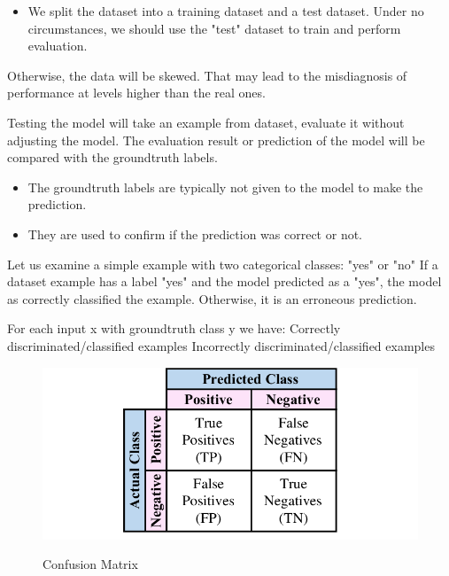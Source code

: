 \begin{itemize}
\item We split the dataset into a training dataset and a test dataset. Under no circumstances, we should use the "test" dataset to train and perform evaluation.
\end{itemize}
 Otherwise, the data will be skewed. That may lead to the misdiagnosis of performance at levels higher than the real ones.

Testing the model will take an example from dataset, evaluate it without adjusting the model.
The evaluation result or prediction of the model will be compared with the groundtruth labels.
\begin{itemize}
\item The groundtruth labels are typically not given to the model to make the prediction.
\item They are used to confirm if the prediction was correct or not.
\end{itemize}

Let us examine a simple example with two categorical classes:
"yes" or "no"
If a dataset example has a label "yes" and the model predicted as a "yes", the model as correctly classified the example.
Otherwise, it is an erroneous prediction.

For each input x with groundtruth class y we have:
    Correctly discriminated/classified examples
    Incorrectly discriminated/classified examples
\espaco
\begin{figure}[ht] \centering \includegraphics[scale=0.5]{figures/Confusion-matrix.png} 
\caption{Confusion Matrix} \label{fig:confusionM}
\citet{Sheng2020} \end{figure}

